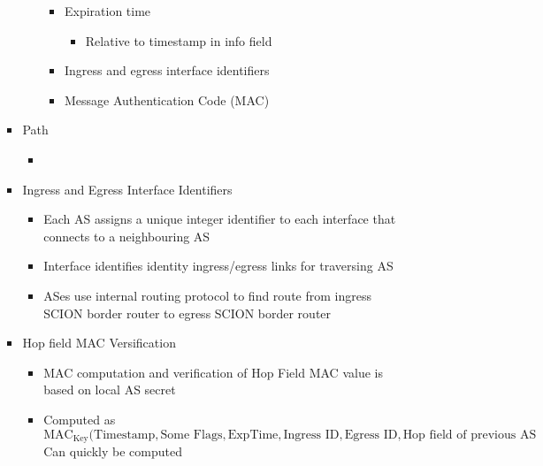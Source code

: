 \begin{itemize}
\begin{itemize}
\begin{itemize}
\begin{itemize}
\begin{itemize}
                                    \item Expiration time
                                        \begin{itemize}
                                            \item Relative to timestamp in info field
                                        \end{itemize}
                                    \item Ingress and egress interface identifiers
                                    \item Message Authentication Code (MAC)
                                \end{itemize}
                        \end{itemize}
                    \item Path
                        \begin{itemize}
                            \item {}
                        \end{itemize}
                    \item Ingress and Egress Interface Identifiers
                        \begin{itemize}
                            \item Each AS assigns a unique integer identifier to each interface that connects to a neighbouring AS
                            \item Interface identifies identity ingress/egress links for traversing AS
                            \item ASes use internal routing protocol to find route from ingress SCION border router to egress SCION border router
                        \end{itemize}
                    \item Hop field MAC Versification
                        \begin{itemize}
                            \item MAC computation and verification of Hop Field MAC value is based on local AS secret
                            \item Computed as $\text{MAC}_{\text{Key}}(\text{Timestamp}, \text{Some Flags}, \text{ExpTime}, \text{Ingress ID}, \text{Egress ID}, \text{Hop field of previous AS}$
                            \ipro Can quickly be computed
                                \begin{itemize}

\end{itemize}
\end{itemize}
\end{itemize}
\end{itemize}
\end{itemize}
